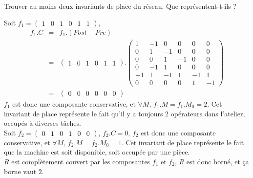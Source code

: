 \documentclass[a4paper]{article}
\begin{document}
\begin{questions}
\question Trouver au moins deux invariants de place du réseau. Que représentent-t-ils ? 

\begin{correction}{.8}
Soit $f_1 = \begin{pmatrix} 1 & 0 & 1 & 0 & 1 & 1\end{pmatrix}$,
\begin{eqnarray*}
f_1 . C &=& f_1 . (Post - Pre)\\
	&=& \begin{pmatrix} 1 & 0 & 1 & 0 & 1 & 1\end{pmatrix} . \begin{pmatrix}
		1 & -1 & 0 & 0 & 0 & 0 \\ %
		0 & 1 & -1 & 0 & 0 & 0 \\ %
		0 & 0 & 1 & -1 & 0 & 0 \\ %
		0 & -1 & 1 & 0 & 0 & 0 \\ %
		-1 & 1 & -1 & 1 & -1 & 1 \\ %
		0 & 0 & 0 & 0 & 1 & -1    %
		\end{pmatrix}\\
	&=& \begin{pmatrix} 0 & 0 & 0 & 0 & 0 & 0\end{pmatrix}
\end{eqnarray*}
$f_1$ est donc une composante conservative, et $\forall M, \, f_1 . M = f_1 . M_0 = 2$.
Cet invariant de place représente le fait qu'il y a toujours 2 opérateurs dans l'atelier, occupés à diverses tâches.\\

Soit $f_2 = \begin{pmatrix}0 & 1 & 0 & 1 & 0 & 0\end{pmatrix}$, $f_2 . C = 0 $, $f_2$ est donc une 
composante conservative, et $\forall M, \, f_2 . M = f_2 . M_0 = 1$.
Cet invariant de place représente le fait que la machine est soit disponible, soit occupée par une pièce.\\

$R$ est complètement couvert par les composantes $f_1$ et $f_2$, $R$ est donc borné, et ça borne vaut $2$.
\end{correction}

\end{questions}


\newpage
{}
\end{document}
